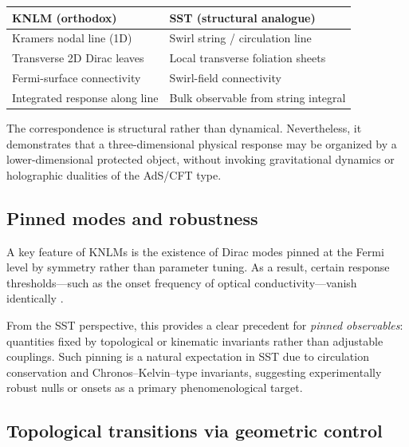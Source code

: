 \documentclass[11pt]{article}
\begin{document}
        \begin{center}
            \begin{tabular}{ll}
                \hline
                \textbf{KNLM (orthodox)} & \textbf{SST (structural analogue)} \\
                \hline
                Kramers nodal line (1D) & Swirl string / circulation line \\
                Transverse 2D Dirac leaves & Local transverse foliation sheets \\
                Fermi-surface connectivity & Swirl-field connectivity \\
                Integrated response along line & Bulk observable from string integral \\
                \hline
            \end{tabular}
        \end{center}

        The correspondence is structural rather than dynamical.
        Nevertheless, it demonstrates that a three-dimensional physical response
        may be organized by a lower-dimensional protected object, without invoking
        gravitational dynamics or holographic dualities of the AdS/CFT type.

    \subsection{Pinned modes and robustness}

        A key feature of KNLMs is the existence of Dirac modes pinned at the Fermi
        level by symmetry rather than parameter tuning.
        As a result, certain response thresholds---such as the onset frequency of
        optical conductivity---vanish identically
        \cite{Domaine2025NatCommOctdong,GusyninSharapov2006OpticalGraphene}.

        From the SST perspective, this provides a clear precedent for
        \emph{pinned observables}: quantities fixed by topological or kinematic
        invariants rather than adjustable couplings.
        Such pinning is a natural expectation in SST due to circulation conservation
        and Chronos--Kelvin--type invariants, suggesting experimentally robust nulls
        or onsets as a primary phenomenological target.

    \subsection{Topological transitions via geometric control}
\end{document}
